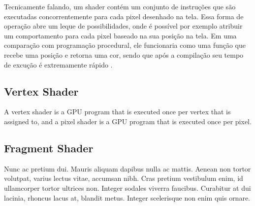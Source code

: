 Tecnicamente falando, um shader contém um conjunto de instruções que são executadas concorrentemente para cada pixel desenhado na tela. Essa forma de operação abre um leque de possibilidades, onde é possível por exemplo atribuir um comportamento para cada pixel baseado na sua posição na tela. Em uma comparação com programação procedural, ele funcionaria como uma função que recebe uma posição e retorna uma cor, sendo que após a compilação seu tempo de excução é extremamente rápido \cite{bookOfShaders}.


\subsection{Vertex Shader}

A vertex shader is a GPU program that is executed once per vertex that is assigned to, and a pixel shader is a GPU program that is executed once per pixel.

\subsection{Fragment Shader}



Nunc ac pretium dui. Mauris aliquam dapibus nulla ac mattis. Aenean non tortor volutpat, varius lectus vitae, accumsan nibh. Cras pretium vestibulum enim, id ullamcorper tortor ultrices non. Integer sodales viverra faucibus. Curabitur at dui lacinia, rhoncus lacus at, blandit metus. Integer scelerisque non enim quis ornare.

\lipsum[13]

	\begin{table}[h!]	
		\centering
	\end{table}

